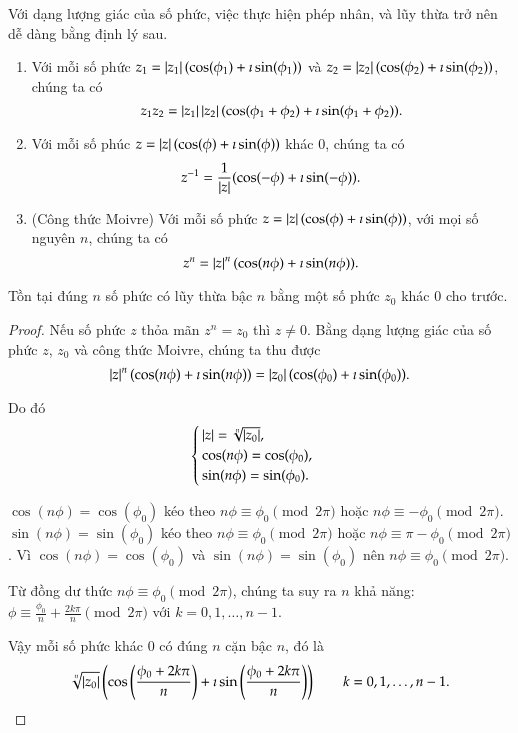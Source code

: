 Với dạng lượng giác của số phức, việc thực hiện phép nhân, và lũy thừa trở nên dễ dàng bằng định lý sau.
\begin{theorem}
	\begin{enumerate}[label={(\roman*)}]
		\item Với mỗi số phức $z_{1} = \left\vert{z_{1}}\right\vert(\cos(\phi_{1}) + \imath\sin(\phi_{1}))$ và $z_{2} = \left\vert{z_{2}}\right\vert(\cos(\phi_{2}) + \imath\sin(\phi_{2}))$, chúng ta có
		      \[
			      z_{1}z_{2} = \left\vert{z_{1}}\right\vert\left\vert{z_{2}}\right\vert(\cos(\phi_{1}+\phi_{2}) + \imath\sin(\phi_{1} + \phi_{2})).
		      \]
		\item Với mỗi số phúc $z = \left\vert{z}\right\vert(\cos(\phi) + \imath\sin(\phi))$ khác $0$, chúng ta có
		      \[
			      z^{-1} = \frac{1}{\left\vert{z}\right\vert}(\cos(-\phi) + \imath\sin(-\phi)).
		      \]
		\item (Công thức Moivre) Với mỗi số phức $z = \left\vert{z}\right\vert(\cos(\phi) + \imath\sin(\phi))$, với mọi số nguyên $n$, chúng ta có
		      \[
			      z^{n} = \left\vert{z}\right\vert^{n}(\cos(n\phi) + \imath\sin(n\phi)).
		      \]
	\end{enumerate}
\end{theorem}

\begin{theorem}
	Tồn tại đúng $n$ số phức có lũy thừa bậc $n$ bằng một số phức $z_{0}$ khác $0$ cho trước.
\end{theorem}

\begin{proof}
	Nếu số phức $z$ thỏa mãn $z^{n} = z_{0}$ thì $z\ne 0$. Bằng dạng lượng giác của số phức $z$, $z_{0}$ và công thức Moivre, chúng ta thu được
	\[
		\left\vert{z}\right\vert^{n}(\cos(n\phi) + \imath\sin(n\phi)) = \left\vert{z_{0}}\right\vert(\cos(\phi_{0}) + \imath\sin(\phi_{0})).
	\]

	Do đó
	\[
		\begin{cases}
			\left\vert{z}\right\vert = \sqrt[n]{\left\vert{z_{0}}\right\vert}, \\
			\cos(n\phi) = \cos(\phi_{0}),    \\
			\sin(n\phi) = \sin(\phi_{0}).
		\end{cases}
	\]

	$\cos(n\phi) = \cos(\phi_{0})$ kéo theo $n\phi \equiv \phi_{0} \pmod{2\pi}$ hoặc $n\phi\equiv -\phi_{0}\pmod{2\pi}$. $\sin(n\phi) = \sin(\phi_{0})$ kéo theo $n\phi \equiv \phi_{0} \pmod{2\pi}$ hoặc $n\phi\equiv \pi-\phi_{0}\pmod{2\pi}$. Vì $\cos(n\phi) = \cos(\phi_{0})$ và $\sin(n\phi) = \sin(\phi_{0})$ nên $n\phi \equiv \phi_{0}\pmod{2\pi}$.

	Từ đồng dư thức $n\phi \equiv \phi_{0}\pmod{2\pi}$, chúng ta suy ra $n$ khả năng: $\phi\equiv \frac{\phi_{0}}{n} + \frac{2k\pi}{n} \pmod{2\pi}$ với $k = 0, 1,\ldots, n-1$.

	Vậy mỗi số phức khác $0$ có đúng $n$ cặn bậc $n$, đó là
	\[
		\sqrt[n]{\left\vert{z_{0}}\right\vert}\left(\cos\left(\frac{\phi_{0} + 2k\pi}{n}\right) + \imath\sin\left(\frac{\phi_{0} + 2k\pi}{n}\right)\right)\qquad k = 0, 1, \ldots, n-1.
	\]
\end{proof}

